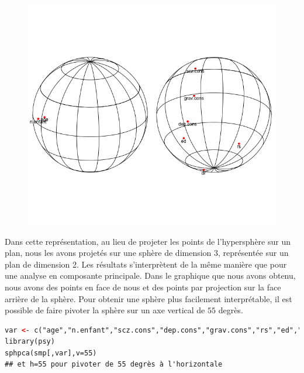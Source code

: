 \begin{figure}[H]\begin{center}\includegraphics[scale=0.5]{ilu/ACPsphere.png}\end{center}\end{figure}

Dans cette représentation, au lieu de projeter les points de l'hypersphère sur un plan, nous les avons projetés sur une sphère de dimension 3, représentée sur un plan de dimension 2. Les résultats s'interprètent de la même manière que pour une analyse en composante principale.\newline
Dans le graphique que nous avons obtenu, nous avons des points en face de nous et des points par projection sur la face arrière de la sphère. Pour obtenir une sphère plus facilement interprétable, il est possible de faire pivoter la sphère sur un axe vertical de $55$ degrès.

\begin{lstlisting}[language=html]
var <- c("age","n.enfant","scz.cons","dep.cons","grav.cons","rs","ed","dr");var
library(psy)
sphpca(smp[,var],v=55)
## et h=55 pour pivoter de 55 degrès à l'horizontale
\end{lstlisting}

